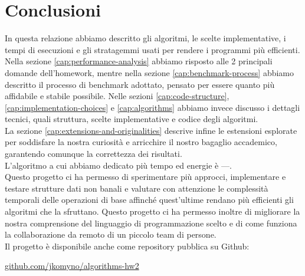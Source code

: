\section{Conclusioni}
\label{cap:conclusions}

In questa relazione abbiamo descritto gli algoritmi, le scelte implementative, i tempi di esecuzioni e gli stratagemmi usati per rendere i programmi più efficienti. \\

\noindent Nella sezione \ref{cap:performance-analysis} abbiamo risposto alle 2 principali domande dell'homework, mentre nella sezione \ref{cap:benchmark-process} abbiamo descritto il processo di benchmark adottato, pensato per essere quanto più affidabile e stabile possibile.
Nelle sezioni \ref{cap:code-structure}, \ref{cap:implementation-choices} e \ref{cap:algorithms} abbiamo invece discusso i dettagli tecnici, quali struttura, scelte implementative e codice degli algoritmi. \\

\noindent La sezione \ref{cap:extensions-and-originalities} descrive infine le estensioni esplorate per soddisfare la nostra curiosità e arricchire il nostro bagaglio accademico, garantendo comunque la correttezza dei risultati. \\

\noindent L'algoritmo a cui abbiamo dedicato più tempo ed energie è ---.\\

\noindent Questo progetto ci ha permesso di sperimentare più approcci, implementare e testare strutture dati non banali e valutare con attenzione le complessità temporali delle operazioni di base affinché quest'ultime rendano più efficienti gli algoritmi che la sfruttano. Questo progetto ci ha permesso inoltre di migliorare la nostra comprensione del linguaggio di programmazione scelto e di come funziona la collaborazione da remoto di un piccolo team di persone. \\

\noindent Il progetto è disponibile anche come repository pubblica su Github:

\begin{center}
\href{https://github.com/jkomyno/algorithms-hw2}{github.com/jkomyno/algorithms-hw2}
\end{center}
